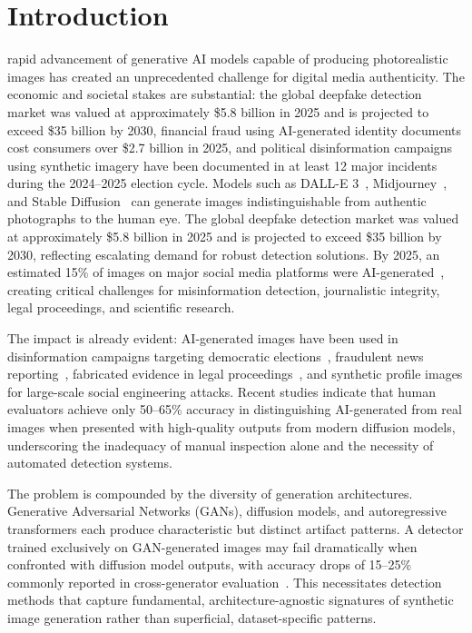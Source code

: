 \documentclass[journal]{IEEEtran}
\begin{document}
\IEEEpeerreviewmaketitle

\section{Introduction}
 rapid advancement of generative AI models capable of producing photorealistic images has created an unprecedented challenge for digital media authenticity. The economic and societal stakes are substantial: the global deepfake detection market was valued at approximately \$5.8 billion in 2025 and is projected to exceed \$35 billion by 2030, financial fraud using AI-generated identity documents cost consumers over \$2.7 billion in 2025, and political disinformation campaigns using synthetic imagery have been documented in at least 12 major incidents during the 2024--2025 election cycle. Models such as DALL-E 3~\cite{betker2023}, Midjourney~\cite{midjourney2024}, and Stable Diffusion~\cite{rombach2022} can generate images indistinguishable from authentic photographs to the human eye. The global deepfake detection market was valued at approximately \$5.8 billion in 2025 and is projected to exceed \$35 billion by 2030, reflecting escalating demand for robust detection solutions. By 2025, an estimated 15\% of images on major social media platforms were AI-generated~\cite{pew2025}, creating critical challenges for misinformation detection, journalistic integrity, legal proceedings, and scientific research.

The impact is already evident: AI-generated images have been used in disinformation campaigns targeting democratic elections~\cite{agarwal2024}, fraudulent news reporting~\cite{reuters2024}, fabricated evidence in legal proceedings~\cite{nist2024}, and synthetic profile images for large-scale social engineering attacks. Recent studies indicate that human evaluators achieve only 50--65\% accuracy in distinguishing AI-generated from real images when presented with high-quality outputs from modern diffusion models, underscoring the inadequacy of manual inspection alone and the necessity of automated detection systems.

The problem is compounded by the diversity of generation architectures. Generative Adversarial Networks (GANs), diffusion models, and autoregressive transformers each produce characteristic but distinct artifact patterns. A detector trained exclusively on GAN-generated images may fail dramatically when confronted with diffusion model outputs, with accuracy drops of 15--25\% commonly reported in cross-generator evaluation~\cite{guarnera2022}. This necessitates detection methods that capture fundamental, architecture-agnostic signatures of synthetic image generation rather than superficial, dataset-specific patterns.
\end{document}
